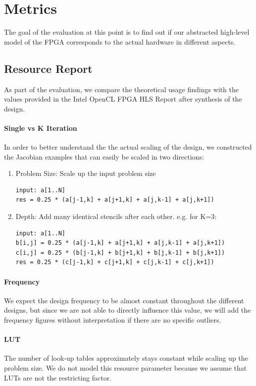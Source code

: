 \section{Metrics}
The goal of the evaluation at this point is to find out if our abstracted high-level model of the FPGA corresponds to the actual hardware in different aspects. 

\subsection{Resource Report}
As part of the evaluation, we compare the theoretical usage findings with the values provided in the Intel OpenCL FPGA HLS Report after synthesis of the design. 

\paragraph{Single vs K Iteration}
In order to better understand the the actual scaling of the design, we constructed the Jacobian examples that can easily be scaled in two directions:
\begin{enumerate}
	\item Problem  Size: Scale up the input problem size
\begin{verbatim}
input: a[1..N]
res = 0.25 * (a[j-1,k] + a[j+1,k] + a[j,k-1] + a[j,k+1])
\end{verbatim}
	\item Depth: Add many identical stencils after each other. e.g. for K=3:
\begin{verbatim} 
input: a[1..N]
b[i,j] = 0.25 * (a[j-1,k] + a[j+1,k] + a[j,k-1] + a[j,k+1])
c[i,j] = 0.25 * (b[j-1,k] + b[j+1,k] + b[j,k-1] + b[j,k+1])
res = 0.25 * (c[j-1,k] + c[j+1,k] + c[j,k-1] + c[j,k+1])
\end{verbatim}
\end{enumerate}



\paragraph{Frequency}
We expect the design frequency to be almost constant throughout the different designs, but since we are not able to directly influence this value, we will add the frequency figures without interpretation if there are no specific outliers. 


\paragraph{LUT}
The number of look-up tables approximately stays constant while scaling up the problem size. We do not model this resource parameter because we assume that LUTs are not the restricting factor.
 
